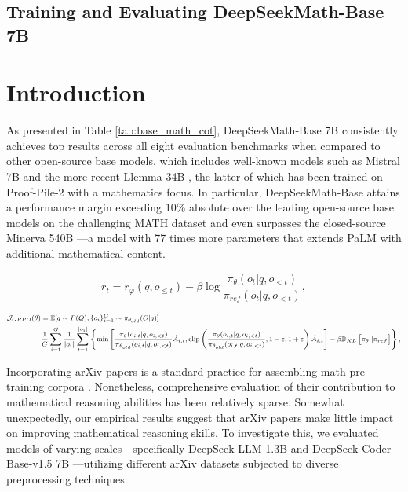 \begin{itemize}[topsep=0pt]
\subsection{Training and Evaluating DeepSeekMath-Base 7B}

\section{Introduction}

As presented in Table \ref{tab:base_math_cot}, DeepSeekMath-Base 7B consistently achieves top results across all eight evaluation benchmarks when compared to other open-source base models, which includes well-known models such as Mistral 7B \citep{mistral} and the more recent Llemma 34B \citep{llemma}, the latter of which has been trained on Proof-Pile-2 \citep{llemma} with a mathematics focus. In particular, DeepSeekMath-Base attains a performance margin exceeding 10\% absolute over the leading open-source base models on the challenging MATH dataset and even surpasses the closed-source Minerva 540B \citep{minerva}—a model with 77 times more parameters that extends PaLM \citep{palm} with additional mathematical content.

\begin{equation}
    r_{t} = r_\varphi(q, o_{\le t}) - \beta \log\frac{\pi_{\theta}(o_{t}|q, o_{<t})}{\pi_{ref}(o_{t}|q, o_{<t})},
\label{eq:PPO-reward}
\end{equation}

\begin{equation}
\footnotesize
\begin{split}
    \mathcal{J}_{GRPO}(\theta) &= \mathbb{E}{[q \sim P(Q), \{o_i\}_{i=1}^G \sim \pi_{\theta_{old}}(O|q)]}  \\
    & \frac{1}{G}\sum_{i=1}^G\frac{1}{|o_i|} \sum_{t=1}^{|o_i|} \left\{ \min \left[ \frac{\pi_\theta(o_{i,t} | q, o_{i,<t})}{\pi_{\theta_{old}}(o_{i,t} | q, o_{i,<t})} \hat{A}_{i,t}, \text{clip} \left( \frac{\pi_\theta(o_{i,t} | q, o_{i,<t})}{\pi_{\theta_{old}}(o_{i,t} | q, o_{i,<t})}, 1 - \varepsilon, 1 + \varepsilon \right)  \hat{A}_{i,t} \right] - \beta \mathbb{D}_{KL}\left[\pi_{\theta} || \pi_{ref}\right]\right\} ,
\end{split}
\label{eq:GRPO-obj}
\end{equation}

Incorporating arXiv papers is a standard practice for assembling math pre-training corpora \citep{minerva,gpt-f,llemma,mathpile}. Nonetheless, comprehensive evaluation of their contribution to mathematical reasoning abilities has been relatively sparse. Somewhat unexpectedly, our empirical results suggest that arXiv papers make little impact on improving mathematical reasoning skills. To investigate this, we evaluated models of varying scales—specifically DeepSeek-LLM 1.3B and DeepSeek-Coder-Base-v1.5 7B \citep{deepseek-coder}—utilizing different arXiv datasets subjected to diverse preprocessing techniques:




\end{itemize}
